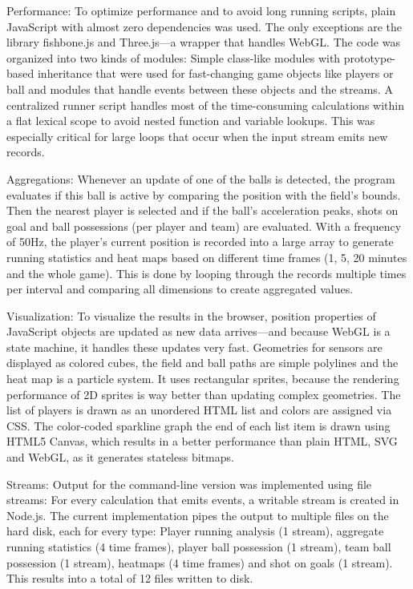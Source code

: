 \documentclass{sig-alternate}
\begin{document}
Performance: To optimize performance
and to avoid long running scripts,
plain JavaScript with almost zero dependencies was used.
The only exceptions are the library fishbone.js
and Three.js---a wrapper that handles WebGL.
The code was organized into two kinds of modules:
Simple class-like modules with prototype-based inheritance
that were used for fast-changing game objects
like players or ball
and modules that handle events between these objects
and the streams.
A centralized runner script handles
most of the time-consuming calculations within a flat lexical scope
to avoid nested function and variable lookups.
This was especially critical for large loops
that occur when the input stream emits new records.

Aggregations: Whenever an update of one of the balls is detected,
the program evaluates if this ball is active
by comparing the position with the field’s bounds.
Then the nearest player is selected
and if the ball’s acceleration peaks,
shots on goal and ball possessions
(per player and team) are evaluated.
With a frequency of 50Hz, the player’s current position
is recorded into a large array to generate running statistics
and heat maps based on different time frames
(1, 5, 20 minutes and the whole game).
This is done by looping through the records
multiple times per interval
and comparing all dimensions to create aggregated values.

Visualization: To visualize the results in the browser,
position properties of JavaScript objects are updated
as new data arrives---and because WebGL is a state machine,
it handles these updates very fast.
Geometries for sensors are displayed as colored cubes,
the field and ball paths are simple polylines
and the heat map is a particle system.
It uses rectangular sprites, because the rendering performance
of 2D sprites is way better than updating complex geometries.
The list of players is drawn as an unordered HTML list
and colors are assigned via CSS.
The color-coded sparkline graph the end of each list item
is drawn using HTML5 Canvas,
which results in a better performance than plain HTML,
SVG and WebGL, as it generates stateless bitmaps.

Streams: Output for the command-line version was implemented
using file streams: For every calculation that emits events,
a writable stream is created in Node.js.
The current implementation pipes the output to multiple files
on the hard disk, each for every type:
Player running analysis (1 stream),
aggregate running statistics (4 time frames),
player ball possession (1 stream),
team ball possession (1 stream),
heatmaps (4 time frames) and shot on goals (1 stream).
This results into a total of 12 files written to disk.
\end{document}
